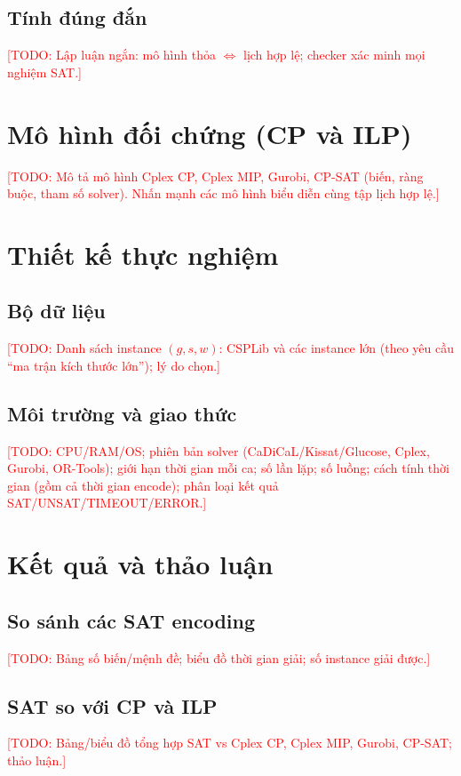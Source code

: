 \documentclass[a4paper,fleqn]{cas-sc}
\newcommand{\TODO}[1]{\textcolor{red}{[TODO: #1]}}
\begin{document}
\subsection{Tính đúng đắn}
\TODO{Lập luận ngắn: mô hình thỏa $\Leftrightarrow$ lịch hợp lệ; checker xác minh
mọi nghiệm SAT.}

\section{Mô hình đối chứng (CP và ILP)}
\TODO{Mô tả mô hình Cplex CP, Cplex MIP, Gurobi, CP-SAT (biến, ràng buộc, tham số
solver). Nhấn mạnh các mô hình biểu diễn cùng tập lịch hợp lệ.}

\section{Thiết kế thực nghiệm}
\subsection{Bộ dữ liệu}
\TODO{Danh sách instance $(g,s,w)$: CSPLib và các instance lớn (theo yêu cầu
``ma trận kích thước lớn''); lý do chọn.}

\subsection{Môi trường và giao thức}
\TODO{CPU/RAM/OS; phiên bản solver (CaDiCaL/Kissat/Glucose, Cplex, Gurobi,
OR-Tools); giới hạn thời gian mỗi ca; số lần lặp; số luồng; cách tính thời gian
(gồm cả thời gian encode); phân loại kết quả SAT/UNSAT/TIMEOUT/ERROR.}

\section{Kết quả và thảo luận}
\subsection{So sánh các SAT encoding}
\TODO{Bảng số biến/mệnh đề; biểu đồ thời gian giải; số instance giải được.}

\subsection{SAT so với CP và ILP}
\TODO{Bảng/biểu đồ tổng hợp SAT vs Cplex CP, Cplex MIP, Gurobi, CP-SAT; thảo luận.}
\end{document}
